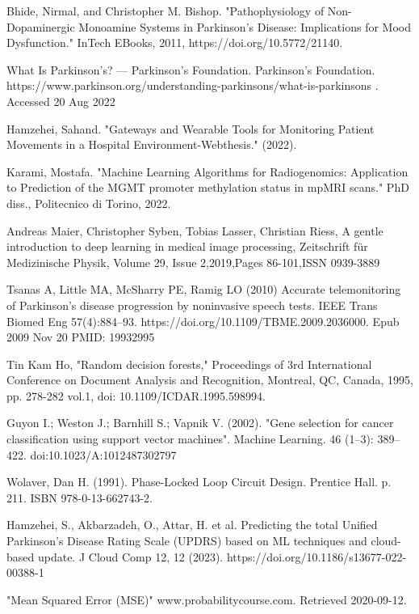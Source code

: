 \begin{thebibliography}{00}

 Bhide, Nirmal, and Christopher M. Bishop. "Pathophysiology of Non-Dopaminergic Monoamine Systems in Parkinson's Disease: Implications for Mood Dysfunction." InTech EBooks, 2011,  https://doi.org/10.5772/21140.


 What Is Parkinson’s? — Parkinson’s Foundation. Parkinson’s Foundation. https://www.parkinson.org/understanding-parkinsons/what-is-parkinsons . Accessed 20 Aug 2022

 Hamzehei, Sahand. "Gateways and Wearable Tools for Monitoring Patient Movements in a Hospital Environment-Webthesis." (2022).

 Karami, Mostafa. "Machine Learning Algorithms for Radiogenomics: Application to Prediction of the MGMT promoter methylation status in mpMRI scans." PhD diss., Politecnico di Torino, 2022.

 Andreas Maier, Christopher Syben, Tobias Lasser, Christian Riess, A gentle introduction to deep learning in medical image processing, Zeitschrift für Medizinische Physik, Volume 29, Issue 2,2019,Pages 86-101,ISSN 0939-3889

 Tsanas A, Little MA, McSharry PE, Ramig LO (2010) Accurate telemonitoring of Parkinson’s disease progression by noninvasive speech tests. IEEE Trans Biomed Eng 57(4):884–93. https://doi.org/10.1109/TBME.2009.2036000. Epub 2009 Nov 20 PMID: 19932995

 Tin Kam Ho, "Random decision forests," Proceedings of 3rd International Conference on Document Analysis and Recognition, Montreal, QC, Canada, 1995, pp. 278-282 vol.1, doi: 10.1109/ICDAR.1995.598994.

 Guyon I.; Weston J.; Barnhill S.; Vapnik V. (2002). "Gene selection for cancer classification using support vector machines". Machine Learning. 46 (1–3): 389–422. doi:10.1023/A:1012487302797

 Wolaver, Dan H. (1991). Phase-Locked Loop Circuit Design. Prentice Hall. p. 211. ISBN 978-0-13-662743-2.

 Hamzehei, S., Akbarzadeh, O., Attar, H. et al. Predicting the total Unified Parkinson’s Disease Rating Scale (UPDRS) based on ML techniques and cloud-based update. J Cloud Comp 12, 12 (2023). https://doi.org/10.1186/s13677-022-00388-1

 "Mean Squared Error (MSE)" www.probabilitycourse.com. Retrieved 2020-09-12.


\end{thebibliography}
